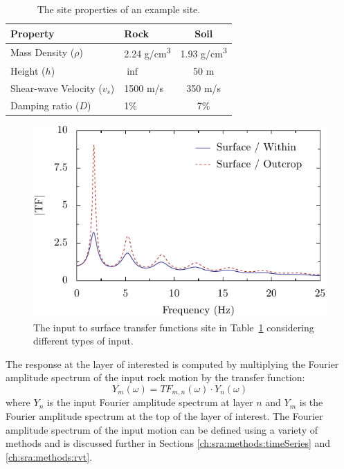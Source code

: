 \documentclass[12pt,oneside]{book}
\begin{document}
\begin{table}[t]
    \centering
    \begin{tabular}{llc}
        \hline\hline
        \textbf{Property} & \textbf{Rock} & \textbf{Soil} \\
        \hline
        Mass Density ($\rho$)  & 2.24 g/cm\textsuperscript{3} & 1.93 g/cm\textsuperscript{3} \\
        Height ($h$) & $\inf$ & 50 m \\
        Shear-wave Velocity ($v_s$) & 1500 m/s & 350 m/s \\
        Damping ratio ($D$) & 1\% & 7\% \\
        \hline
    \end{tabular}
    \caption{The site properties of an example site.}
    \label{tab:siteResponse:site}
\end{table}
\begin{figure}[t]
    \begin{center}
        \includegraphics[width=\linewidth]{figures/siteResponse/sra-transFunc.pdf}
    \end{center}
    \caption{The input to surface transfer functions site in Table~\ref{tab:siteResponse:site}
    considering different types of input.}
    \label{fig:siteResponse:transFunc}
\end{figure}


The response at the layer of interested is computed by multiplying the Fourier amplitude spectrum of the
input rock motion by the transfer function:
\begin{equation}
    Y_m(\omega) = TF_{m,n}(\omega) \cdot Y_n(\omega)
    \label{eq:tfApplication}
\end{equation}
where $Y_n$ is the input Fourier amplitude spectrum at layer $n$ and $Y_m$ is the Fourier amplitude
spectrum at the top of the layer of interest.  The Fourier amplitude spectrum of the input motion
can be defined using a variety of methods and is discussed further in Sections
\ref{ch:sra:methods:timeSeries} and \ref{ch:sra:methods:rvt}.
\end{document}
